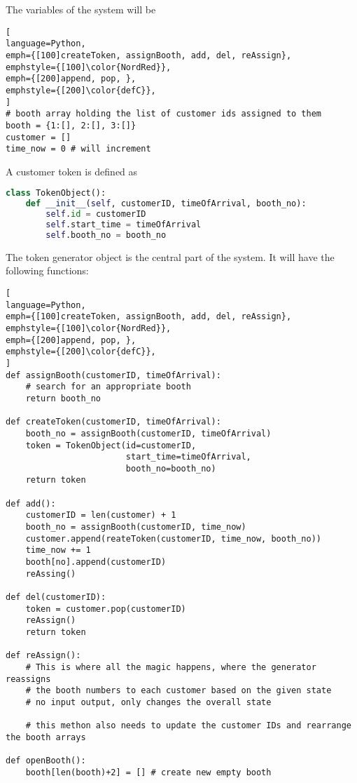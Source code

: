 \documentclass[article, 11pt, a4paper]{memoir}
\begin{document}
\begin{solution}
    [f]
    The variables of the system will be

\begin{lstlisting}[
language=Python,
emph={[100]createToken, assignBooth, add, del, reAssign},
emphstyle={[100]\color{NordRed}},
emph={[200]append, pop, },
emphstyle={[200]\color{defC}},
]
# booth array holding the list of customer ids assigned to them
booth = {1:[], 2:[], 3:[]}
customer = []
time_now = 0 # will increment
\end{lstlisting}

    A customer token is defined as

    \begin{lstlisting}[language=Python]
class TokenObject():
    def __init__(self, customerID, timeOfArrival, booth_no):
        self.id = customerID
        self.start_time = timeOfArrival
        self.booth_no = booth_no 
    \end{lstlisting}
    
    
    The token generator object is the central part of the system. It will have the
    following functions:

\begin{lstlisting}[
language=Python,
emph={[100]createToken, assignBooth, add, del, reAssign},
emphstyle={[100]\color{NordRed}},
emph={[200]append, pop, },
emphstyle={[200]\color{defC}},
]
def assignBooth(customerID, timeOfArrival):
    # search for an appropriate booth
    return booth_no

def createToken(customerID, timeOfArrival):
    booth_no = assignBooth(customerID, timeOfArrival)
    token = TokenObject(id=customerID,
                        start_time=timeOfArrival,
                        booth_no=booth_no)
    return token

def add():
    customerID = len(customer) + 1
    booth_no = assignBooth(customerID, time_now)
    customer.append(reateToken(customerID, time_now, booth_no))
    time_now += 1
    booth[no].append(customerID)
    reAssing()

def del(customerID):
    token = customer.pop(customerID)
    reAssign()
    return token

def reAssign():
    # This is where all the magic happens, where the generator reassigns
    # the booth numbers to each customer based on the given state
    # no input output, only changes the overall state

    # this methon also needs to update the customer IDs and rearrange the booth arrays

def openBooth():
    booth[len(booth)+2] = [] # create new empty booth
\end{lstlisting}
\end{solution}
\end{document}
